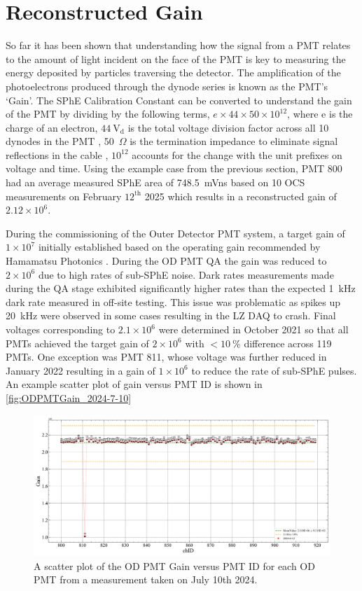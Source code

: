 \section{Reconstructed Gain}\label{sec:RecGain}
So far it has been shown that understanding how the signal from a PMT relates to the amount of light incident on the face of the PMT is key to measuring the energy deposited by particles traversing the detector. The amplification of the photoelectrons produced through the dynode series is known as the PMT's `Gain'. The SPhE Calibration Constant can be converted to understand the gain of the PMT by dividing by the following terms, $e\times44\times50\times10^{12}$, where e is the charge of an electron, $44~\text{V}_{\text{d}}$ is the total voltage division factor across all 10 dynodes in the PMT \cite{HamamatsuR5912}, 50~$\Omega$ is the termination impedance to eliminate signal reflections in the cable \cite{LZ:2024bvw}, $10^{12}$ accounts for the change with the unit prefixes on voltage and time. Using the example case from the previous section, PMT 800 had an average measured SPhE area of 748.5~mVns based on 10 OCS measurements on February $12^{\text{th}}$ 2025 which results in a reconstructed gain of $2.12\times10^6$.

During the commissioning of the Outer Detector PMT system, a target gain of $1\times10^{7}$ initially established based on the operating gain recommended by Hamamatsu Photonics \cite{LZTDR,HamamatsuR5912}. During the OD PMT QA the gain was reduced to $2\times10^{6}$ due to high rates of sub-SPhE noise. Dark rates measurements made during the QA stage exhibited significantly higher rates than the expected 1~kHz dark rate measured in off-site testing. This issue was problematic as spikes up 20~kHz were observed in some cases resulting in the LZ DAQ to crash. Final voltages corresponding to $2.1\times10^{6}$ were determined in October 2021 so that all PMTs achieved the target gain of $2\times10^6$ with $<10~\%$ difference across 119 PMTs. One exception was PMT 811, whose voltage was further reduced in January 2022 resulting in a gain of $1\times10^6$ to reduce the rate of sub-SPhE pulses.
An example scatter plot of gain versus PMT ID is shown in \autoref{fig:ODPMTGain_2024-7-10}

\begin{figure}
    \centering
    \includegraphics[width=\textwidth]{figures/ODCommissioning/2024-6-12_ODPMT_Gain.pdf}
    \caption{A scatter plot of the OD PMT Gain versus PMT ID for each OD PMT from a measurement taken on July 10th 2024.}
    \label{fig:ODPMTGain_2024-7-10}
\end{figure}

